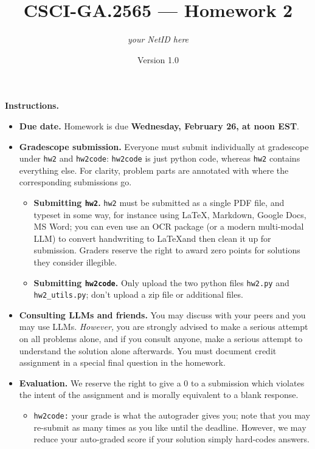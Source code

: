 \documentclass{article}
\title{CSCI-GA.2565 --- Homework 2}
\author{\emph{your NetID here}}
\date{Version 1.0}
\theoremstyle{definition}
\theoremstyle{remark}
\begin{document}
\maketitle

\noindent\textbf{Instructions.}
  \begin{itemize}
    \item
      \textbf{Due date.}
      Homework is due \textbf{Wednesday, February 26, at noon EST}.

    \item
      \textbf{Gradescope submission.}
      Everyone must submit individually at gradescope under \texttt{hw2} and \texttt{hw2code}:
      \texttt{hw2code} is just python code, whereas \texttt{hw2} contains everything else.
      For clarity, problem parts are annotated with where the corresponding submissions go.


      \begin{itemize}
        \item
          \textbf{Submitting \texttt{hw2}.}
          \texttt{hw2} must be submitted as a single PDF file, and typeset in some way,
          for instance using \LaTeX, Markdown, Google Docs, MS Word; you can even use an OCR
          package (or a modern multi-modal LLM) to convert handwriting to \LaTeX and then clean
          it up for submission.  Graders reserve the right to award zero points for
          solutions they consider illegible.

        \item
          \textbf{Submitting \texttt{hw2code}.}
          Only upload the two python files \texttt{hw2.py} and \texttt{hw2\_utils.py};
          don't upload a zip file or additional files.

      \end{itemize}

    \item
      \textbf{Consulting LLMs and friends.}
      You may discuss with your peers and you may use LLMs.  \emph{However,} you are strongly
      advised to make a serious attempt on all problems alone, and if you consult anyone,
      make a serious attempt to understand the solution alone afterwards.
      You must document credit assignment in a special final question in the homework.

    \item
      \textbf{Evaluation.}
      We reserve the right to give a 0 to a submission which violates the intent of the assignment
      and is morally equivalent to a blank response.
      \begin{itemize}
        \item
          \texttt{hw2code:} your grade is what the autograder gives you;
          note that you may re-submit as many times as you like until the deadline.
          However, we may reduce your auto-graded score if your solution simply hard-codes answers.


\end{itemize}
\end{itemize}
\end{document}
